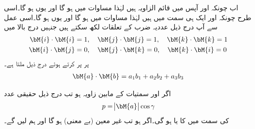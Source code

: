 اب چونکہ  اور  آپس میں قائم الزاویہ ہیں لہٰذا مساوات  میں  ہو گا اور یوں  ہو گا۔اسی طرح چونکہ  اور  ایک ہی سمت میں ہیں  لہٰذا مساوات  میں  ہو گا اور یوں  ہو گا۔اسی عمل سے آپ درج ذیل  عددیہ ضرب کے تعلقات لکھ سکتے ہیں جنہیں درج بالا میں
\begin{align}
\bM{i}\cdot\bM{i}&=1,\quad \bM{j}\cdot\bM{j}=1,\quad \bM{k}\cdot\bM{k}=1\\
\bM{i}\cdot\bM{j}&=0,\quad \bM{j}\cdot\bM{k}=0,\quad \bM{k}\cdot\bM{i}=0
\end{align}
پر پر کرتے ہوئے درج ذیل ملتا ہے۔
\begin{align}\label{مساوات_الجبرا_غیر_سمتی_ضرب_اجزاء}
\bM{a}\cdot \bM{b}=a_1b_1+a_2b_2+a_3b_3
\end{align}

اگر  اور   سمتیات کے مابین زاویہ  ہو تب درج ذیل حقیقی عدد
\begin{align*}
p=\abs{\bM{a}}\cos \gamma
\end{align*}
 کی سمت میں  کا  یا  ہو گی۔اگر  ہو تب  غیر معین (بے معنی) ہو گا اور ہم  لیں گے۔

